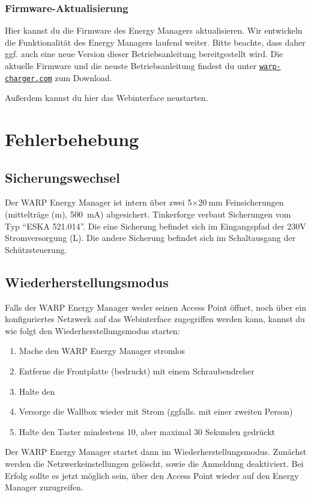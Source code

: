 \documentclass[a4paper,10pt]{article}
\newcommand{\gfx}[1]{\texttt{[image: \#1]}}
\newcommand\rurl[2]{%
  \href{#1}{\nolinkurl{#2}}%
}
\begin{document}
\begin{multicols*}{2}
	\subsubsection{Firmware-Aktualisierung}\label{firmware-update}
	Hier kannst du die Firmware des Energy Managers aktualisieren. Wir entwickeln die Funktionalität
	des Energy Managers laufend weiter. Bitte beachte, dass daher ggf. auch eine neue
	Version dieser Betriebsanleitung bereitgestellt wird.
	Die aktuelle Firmware und die neuste Betriebsanleitung findest du unter
	\rurl{https://warp-charger.com}{warp-charger.com} zum Download.

	Außerdem kannst du hier das Webinterface neustarten.


	\newpage
	\section{Fehlerbehebung}

	\subsection{Sicherungswechsel}
	Der WARP Energy Manager ist intern über zwei 5$\times\SI{20}{\milli\meter}$ Feinsicherungen (mittelträge (m), \SI{500}{\milli\ampere}) abgesichert.
	Tinkerforge verbaut Sicherungen vom Typ \enquote{ESKA 521.014}. Die eine
	Sicherung befindet sich im Eingangspfad der 230V Stromversorgung (L). Die
	andere Sicherung befindet sich im Schaltausgang der Schützsteuerung.


	\subsection{Wiederherstellungsmodus}\label{recovery}
	Falls der WARP Energy Manager weder seinen Access Point öffnet, noch über ein konfiguriertes Netzwerk auf das Webinterface zugegriffen werden kann,
	kannst du wie folgt den Wiederherstellungsmodus starten:
	\begin{enumerate}
	 \item Mache den WARP Energy Manager stromlos
	 \item Entferne die Frontplatte (bedruckt) mit einem Schraubendreher
	 \item Halte den 
	 \item Versorge die Wallbox wieder mit Strom (ggfalls. mit einer zweiten Person)
	 \item Halte den Taster mindestens 10, aber maximal 30 Sekunden gedrückt
	\end{enumerate}
	Der WARP Energy Manager startet dann im Wiederherstellungsmodus. Zunächst werden die Netzwerkeinstellungen gelöscht, sowie die Anmeldung deaktiviert.
	Bei Erfolg sollte es jetzt möglich sein, über den Access Point wieder auf
	den Energy Manager zuzugreifen.


\end{multicols*}
\end{document}
